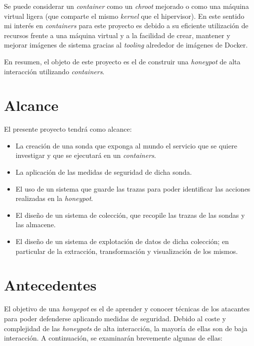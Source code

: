 Se puede considerar un \emph{container} como un \emph{chroot} mejorado o como una máquina virtual ligera (que comparte el mismo \emph{kernel} que el hipervisor). En este sentido
mi interés en \emph{containers} para este proyecto es debido a su eficiente utilización de recursos frente a una máquina virtual y a la facilidad
de crear, mantener y mejorar imágenes de sistema gracias al \emph{tooling} alrededor de imágenes de Docker.

En resumen, el objeto de este proyecto es el de construir una \emph{honeypot} de alta interacción utilizando \emph{containers}.

\section{Alcance}

El presente proyecto tendrá como alcance:
\begin{itemize}
    \item La creación de una sonda que exponga al mundo el servicio que se quiere investigar y que se ejecutará en un \emph{containers}.
    \item La aplicación de las medidas de seguridad de dicha sonda.
    \item El uso de un sistema que guarde las trazas para poder identificar las acciones realizadas en la \emph{honeypot}.
    \item El diseño de un sistema de colección, que recopile las trazas de las sondas y las almacene.
    \item El diseño de un sistema de explotación de datos de dicha colección; en particular de la extracción, transformación y visualización de los mismos.
\end{itemize}

\section{Antecedentes}


El objetivo de una \emph{honyepot} es el de aprender y conocer técnicas de los atacantes para poder defenderse aplicando medidas de seguridad.
Debido al coste y complejidad de las \emph{honeypots} de alta interacción, la mayoría de ellas son de baja interacción. A continuación, se examinarán brevemente algunas de ellas:

